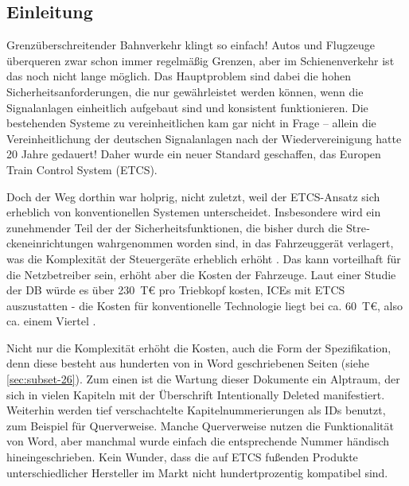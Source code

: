 \documentclass[twoside]{article}
\begin{document}
\begin{multicols}{2}
\noindent 

\section{Einleitung}

Grenzüberschreitender Bahnverkehr klingt so einfach! Autos und Flugzeuge überqueren zwar schon immer regelmäßig Grenzen, aber im Schienenverkehr ist das noch nicht lange möglich.  Das Hauptproblem sind dabei die hohen Sicherheitsanforderungen, die nur gewährleistet werden können, wenn die Signalanlagen einheitlich aufgebaut sind und konsistent funktionieren.  Die bestehenden Systeme zu vereinheitlichen kam gar nicht in Frage -- allein die Vereinheitlichung der deutschen Signalanlagen nach der Wiedervereinigung hatte 20 Jahre gedauert! Daher wurde ein neuer Standard geschaffen, das Europen Train Control System (ETCS).

Doch der Weg dorthin war holprig, nicht zuletzt, weil der ETCS-Ansatz sich erheblich von konventionellen Systemen unterscheidet.  Insbesondere wird ein zunehmender Teil der der Sicher­heitsfunktionen, die bisher durch die Stre­ckeneinrichtungen wahrgenommen worden sind, in das Fahrzeuggerät verlagert, was die Komplexität der Steuergeräte erheblich erhöht \cite{Hase2011}.  Das kann vorteilhaft für die Netzbetreiber sein, erhöht aber die Kosten der Fahrzeuge.  Laut einer Studie der DB würde es über 230~T€ pro Triebkopf kosten, ICEs mit ETCS auszustatten - die Kosten für konventionelle Technologie liegt bei ca. 60~T€, also ca. einem Viertel \cite{Hase2009}.

Nicht nur die Komplexität erhöht die Kosten, auch die Form der Spezifikation, denn diese besteht aus hunderten von in Word geschriebenen Seiten (siehe \ref{sec:subset-26}).  Zum einen ist die Wartung dieser Dokumente ein Alptraum, der sich in vielen Kapiteln mit der Überschrift \glqq{}Intentionally Deleted\grqq{} manifestiert. Weiterhin werden tief verschachtelte Kapitelnummerierungen als IDs benutzt, zum Beispiel für Querverweise.  Manche Querverweise nutzen die Funktionalität von Word, aber manchmal wurde einfach die entsprechende Nummer händisch hineingeschrieben.  Kein Wunder, dass die auf ETCS fußenden Produkte unterschiedlicher Hersteller im Markt nicht hundertprozentig kompatibel sind.


\end{multicols}
\end{document}
